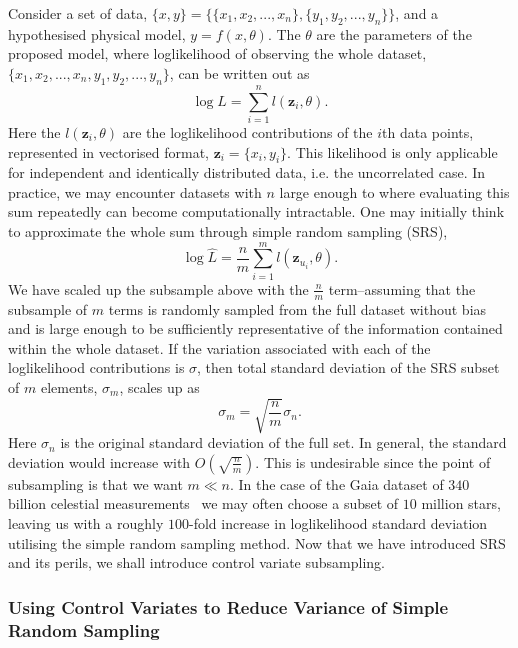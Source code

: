 Consider a set of data, $\{ x,y \}= \{ \{x_1,x_2,...,x_n\}, \{y_1,y_2,...,y_n\} \}$, and a hypothesised physical model, $y= f(x,\theta)$. The $\theta$ are the parameters of the proposed model, where loglikelihood of observing the whole dataset, $\{x_1,x_2,...,x_n,y_1,y_2,...,y_n\}$, can be written out as
\begin{equation}
\log L = \sum_{i=1}^{n} l (\textbf{z}_{i},\theta).
\end{equation}
%
Here the $l (\textbf{z}_{i},\theta)$ are the loglikelihood contributions of the $i$th data points, represented in vectorised format, $\textbf{z}_{i}= \{x_i,y_i\}$. This likelihood is only applicable for independent and identically distributed data, i.e. the uncorrelated case. In practice, we may encounter datasets with $n$ large enough to where evaluating this sum repeatedly can become computationally intractable. One may initially think to approximate the whole sum through simple random sampling (SRS),
%
\begin{equation}
\log \hat{L} = \frac{n}{m} \sum_{i=1}^{m} l ( \textbf{z}_{u_{i}},\theta).
\label{eq:fgf}
\end{equation}
%
We have scaled up the subsample above with the $\frac{n}{m}$ term--assuming that the subsample of $m$ terms is randomly sampled from the full dataset without bias and is large enough to be sufficiently representative of the information contained within the whole dataset. If the variation associated with each of the loglikelihood contributions is $\sigma$, then total standard deviation of the SRS subset of $m$ elements, $\sigma_m$, scales up as
%
\begin{equation}
\sigma_m = \sqrt{\frac{n}{m}} \sigma_{n}.
\end{equation}
%
Here $\sigma_{n}$ is the original standard deviation of the full set. In general, the standard deviation would increase with $O(\sqrt{\frac{n}{m}})$. This is undesirable since the point of subsampling is that we want $m \ll n$. In the case of the Gaia dataset of $340$ billion celestial measurements~\cite{2016,https://doi.org/10.48550/arxiv.2208.00211} we may often choose a subset of $10$ million stars, leaving us with a roughly $100$-fold increase in loglikelihood standard deviation utilising the simple random sampling method. Now that we have introduced SRS and its perils, we shall introduce control variate subsampling.

\subsubsection{Using Control Variates to Reduce Variance of Simple Random Sampling}

